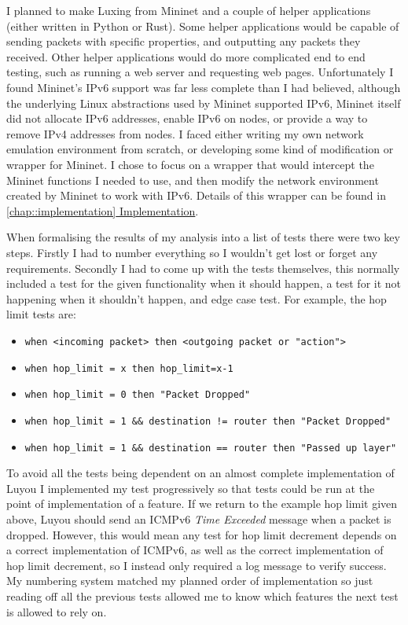 \documentclass[12pt,a4paper,twoside,openright]{report}
\begin{document}
\bigskip

I planned to make Luxing from Mininet and a couple of helper applications (either written in Python or Rust).  Some helper applications would be capable of sending packets with specific properties, and outputting any packets they received. Other helper applications would do more complicated end to end testing, such as running a web server and requesting web pages.  Unfortunately I found Mininet's IPv6 support was far less complete than I had believed, although the underlying Linux abstractions used by Mininet supported IPv6, Mininet itself did not allocate IPv6 addresses, enable IPv6 on nodes, or provide a way to remove IPv4 addresses from nodes.  I faced either writing my own network emulation environment from scratch, or developing some kind of modification or wrapper for Mininet.  I chose to focus on a wrapper that would intercept the Mininet functions I needed to use, and then modify the network environment created by Mininet to work with IPv6. Details of this wrapper can be found in \ref{chap::implementation}\hyperref[chap::implementation]{ Implementation}.

\bigskip

When formalising the results of my analysis into a list of tests there were two key steps. Firstly I had to number everything so I wouldn't get lost or forget any requirements.  Secondly I had to come up with the tests themselves, this normally included a test for the given functionality when it should happen, a test for it not happening when it shouldn't happen, and edge case test.  For example, the hop limit tests are:
\begin{itemize}
\item \verb!when <incoming packet> then <outgoing packet or "action">!
\item \verb!when hop_limit = x then hop_limit=x-1!
\item \verb!when hop_limit = 0 then "Packet Dropped"!
\item \verb+when hop_limit = 1 && destination != router then "Packet Dropped" +
\item \verb!when hop_limit = 1 && destination == router then "Passed up layer"!
\end{itemize}

\bigskip

To avoid all the tests being dependent on an almost complete implementation of Luyou I implemented my test progressively so that tests could be run at the point of implementation of a feature. If we return to the example hop limit given above, Luyou should send an ICMPv6 \textit{Time Exceeded} message when a packet is dropped.  However, this would mean any test for hop limit decrement depends on a correct implementation of ICMPv6, as well as the correct implementation of hop limit decrement, so I instead only required a log message to verify success.  My numbering system matched my planned order of implementation so just reading off all the previous tests allowed me to know which features the next test is allowed to rely on.  
\end{document}
